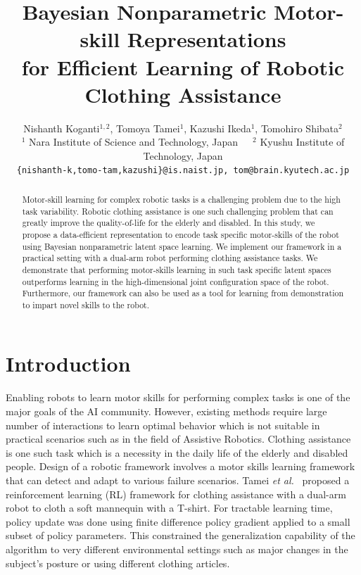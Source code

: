 \documentclass{article}
\title{Bayesian Nonparametric Motor-skill Representations \\ for Efficient Learning of Robotic Clothing Assistance}
\author{
  Nishanth Koganti$^{1,2}$, Tomoya Tamei$^{1}$, Kazushi Ikeda$^{1}$, Tomohiro Shibata$^{2}$\\
  $^1$ Nara Institute of Science and Technology, Japan~~~$^2$ Kyushu Institute of Technology, Japan\\
  \texttt{\{nishanth-k,tomo-tam,kazushi\}@is.naist.jp, tom@brain.kyutech.ac.jp} \\
}
\begin{document}
\maketitle

\begin{abstract}
Motor-skill learning for complex robotic tasks is a challenging problem due to the high task variability. Robotic clothing assistance is one such challenging problem that can greatly improve the quality-of-life for the elderly and disabled. In this study, we propose a data-efficient representation to encode task specific motor-skills of the robot using Bayesian nonparametric latent space learning. We implement our framework in a practical setting with a dual-arm robot performing clothing assistance tasks. We demonstrate that performing motor-skills learning in such task specific latent spaces outperforms learning in the high-dimensional joint configuration space of the robot. Furthermore, our framework can also be used as a tool for learning from demonstration to impart novel skills to the robot.
\end{abstract}

\section{Introduction}
\label{section:introduction}

Enabling robots to learn motor skills for performing complex tasks is one of the major goals of the AI community. However, existing methods require large number of interactions to learn optimal behavior which is not suitable in practical scenarios such as in the field of Assistive Robotics. Clothing assistance is one such task which is a necessity in the daily life of the elderly and disabled people. Design of a robotic framework involves a motor skills learning framework that can detect and adapt to various failure scenarios. Tamei \emph{et al.}~\cite{tamei} proposed a reinforcement learning (RL) framework for clothing assistance with a dual-arm robot to cloth a soft mannequin with a T-shirt. For tractable learning time, policy update was done using finite difference policy gradient applied to a small subset of policy parameters. This constrained the generalization capability of the algorithm to very different environmental settings such as major changes in the subject's posture or using different clothing articles.
\end{document}

